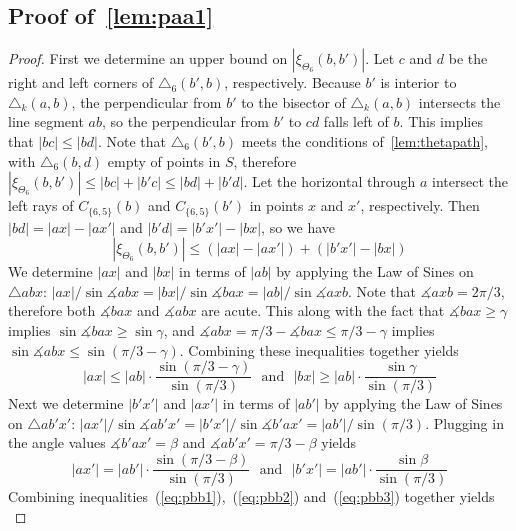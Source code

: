 \documentclass[runningheads,a4paper]{llncs}
\newcommand{\pp}{\xi}
\newcommand{\ang}{\measuredangle}
\begin{document}
\subsection{Proof of~\autoref{lem:paa1}}
\aalemma*
\begin{proof}
First we determine an upper bound on $|\pp_{\Theta_6}(b, b')|$. Let $c$ and $d$ be the right and left corners of $\triangle_6(b', b)$, respectively. Because $b'$ is interior to $\triangle_k(a, b)$, the perpendicular from $b'$ to the bisector of $\triangle_k(a, b)$ intersects the line segment $ab$, so  the perpendicular from $b'$ to $cd$ falls left of $b$. This implies that $|bc| \le |bd|$. 
Note that $\triangle_6(b',b)$ meets the conditions of~\autoref{lem:thetapath}, with $\triangle_6(b,d)$ empty of points in $S$, therefore   
$|\pp_{\Theta_6}(b, b')| \le |bc| + |b'c| \le |bd| + |b'd|$. 
Let the horizontal through $a$ intersect the left rays of $C_{\{6,5\}}(b)$ and $C_{\{6,5\}}(b')$ in points $x$ and $x'$, respectively. 
Then $|bd| = |ax|-|ax'|$ and $|b'd| = |b'x'|-|bx|$, so we have 
\begin{equation}
|\pp_{\Theta_6}(b, b')| \le (|ax|-|ax'|)+(|b'x'|-|bx|)
\label{eq:pbb1}
\end{equation}
We determine $|ax|$ and $|bx|$ in terms of $|ab|$ by applying the Law of Sines on $\triangle abx$: 
$|ax|/\sin\ang{abx}=|bx|/\sin\ang{bax}=|ab|/\sin\ang{axb}$. Note that $\ang{axb} = 2\pi/3$,  therefore both $\ang{bax}$ and 
$\ang{abx}$ are acute.  This along with the fact that $\ang{bax} \ge \gamma$ implies $\sin\ang{bax} \ge \sin\gamma$, and 
 $\ang{abx} = \pi/3-\ang{bax} \le \pi/3-\gamma$ implies $\sin\ang{abx} \le \sin(\pi/3-\gamma)$. Combining these inequalities together yields
\begin{equation}
|ax| \le |ab|\cdot\frac{\sin(\pi/3-\gamma)}{\sin(\pi/3)} \mbox{~~and~~} |bx| \ge |ab|\cdot\frac{\sin\gamma}{\sin(\pi/3)}
\label{eq:pbb2}
\end{equation}
Next we determine $|b'x'|$ and $|ax'|$ in terms of $|ab'|$ by applying the Law of Sines on $\triangle ab'x'$: 
$|ax'|/\sin\ang{ab'x'}=|b'x'|/\sin\ang{b'ax'}=|ab'|/\sin(\pi/3)$. Plugging in the angle values 
$\ang{b'ax'} = \beta$ and $\ang{ab'x'} = \pi/3-\beta$ yields 
\begin{equation}
|ax'| = |ab'|\cdot\frac{\sin(\pi/3-\beta)}{\sin(\pi/3)} \mbox{~~and~~} |b'x'| = |ab'|\cdot\frac{\sin\beta}{\sin(\pi/3)}
\label{eq:pbb3}
\end{equation}
Combining inequalities~(\ref{eq:pbb1}),~(\ref{eq:pbb2}) and~(\ref{eq:pbb3}) together yields 
\begin{equation}

\end{equation}
\end{proof}
\end{document}
